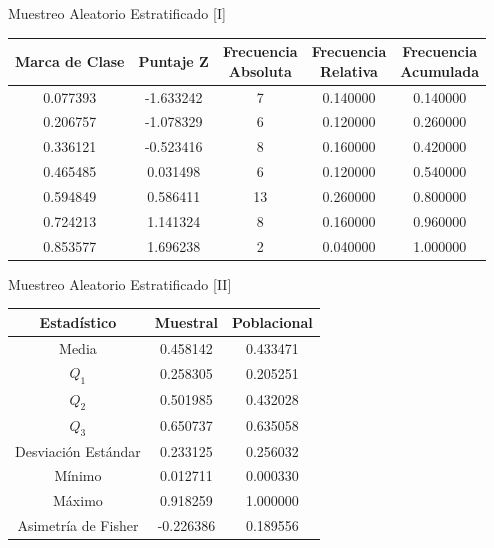 \documentclass{beamer}
\begin{document}
    \begin{frame}{Muestreo Aleatorio Estratificado [I]}
        \begin{center}
            \begin{tabular}{|c|c|c|c|c|}
                \hline
                Marca de Clase & Puntaje Z & \makecell{Frecuencia\\Absoluta} & \makecell{Frecuencia\\Relativa} & \makecell{Frecuencia\\Acumulada} \\
                \hline
                0.077393 & -1.633242 & 7  & 0.140000 & 0.140000 \\
                0.206757 & -1.078329 & 6  & 0.120000 & 0.260000 \\
                0.336121 & -0.523416 & 8  & 0.160000 & 0.420000 \\
                0.465485 & 0.031498  & 6  & 0.120000 & 0.540000 \\
                0.594849 & 0.586411  & 13 & 0.260000 & 0.800000 \\
                0.724213 & 1.141324  & 8  & 0.160000 & 0.960000 \\
                0.853577 & 1.696238  & 2  & 0.040000 & 1.000000 \\
                \hline
            \end{tabular}
        \end{center}
    \end{frame}

    \begin{frame}{Muestreo Aleatorio Estratificado [II]}
        \begin{center}
            \begin{tabular}{|c|cc|}
                \hline
                Estadístico & Muestral & Poblacional \\
                \hline
                Media & 0.458142  & 0.433471 \\
                $Q_1$ & 0.258305 & 0.205251 \\
                $Q_2$ & 0.501985 & 0.432028 \\
                $Q_3$ & 0.650737 & 0.635058 \\
                Desviación Estándar & 0.233125 & 0.256032 \\
                Mínimo & 0.012711 & 0.000330 \\
                Máximo & 0.918259 & 1.000000 \\
                Asimetría de Fisher & -0.226386 & 0.189556 \\
                \hline
            \end{tabular}
        \end{center}
    \end{frame}
\end{document}
